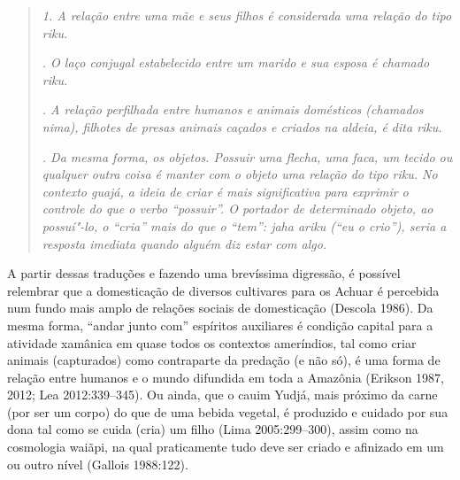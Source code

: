 \begin{quote}
\emph{1. A relação entre uma mãe e seus filhos é considerada uma relação do
tipo \emph{riku}.}

\emph{. O laço conjugal estabelecido entre um marido e sua esposa é chamado
\emph{riku}.}

\emph{. A relação perfilhada entre humanos e animais domésticos (chamados
\emph{nima}), filhotes de presas animais caçados e criados na aldeia, é
dita \emph{riku}.}

\emph{. Da mesma forma, os objetos. Possuir uma flecha, uma faca, um tecido
ou qualquer outra coisa é manter com o objeto uma relação do tipo
\emph{riku}. No contexto guajá, a ideia de criar é mais significativa
para exprimir o controle do que o verbo ``possuir''. O portador de
determinado objeto, ao possuí"-lo, o ``cria'' mais do que o ``tem'':
\emph{jaha ariku} (``eu o crio''), seria a resposta imediata quando
alguém diz estar com algo.}
\end{quote}

A partir dessas traduções e fazendo uma brevíssima digressão, é possível
relembrar que a domesticação de diversos cultivares para os Achuar é
percebida num fundo mais amplo de relações sociais de domesticação
(Descola 1986). Da mesma forma, ``andar junto com'' espíritos auxiliares é
condição capital para a atividade xamânica em quase todos os contextos
ameríndios, tal como criar animais (capturados) como contraparte da
predação (e não só), é uma forma de relação entre humanos e o mundo
difundida em toda a Amazônia (Erikson 1987, 2012; Lea 2012:339--345). Ou
ainda, que o cauim Yudjá, mais próximo da carne (por ser um corpo) do
que de uma bebida vegetal, é produzido e cuidado por sua dona tal como
se cuida (cria) um filho (Lima 2005:299--300), assim como na cosmologia
waiãpi, na qual praticamente tudo deve ser criado e afinizado em um ou
outro nível (Gallois 1988:122).

